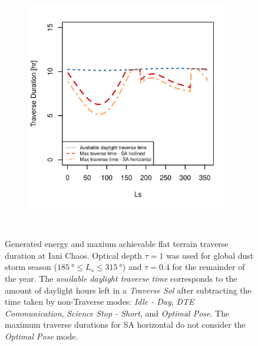 \begin{figure}[h]
\begin{subfigure}[t]{\subfigureWidth}
        \includegraphics[height=\graphicsHeight]{sections/design/solar-array/plots/ianichaos-75w-max-traverse-durations.png}
		\label{fig:plot:sub:iani-chaos-max-traverse-durations}
	\end{subfigure}\\[0.8ex]
    \caption[Generated energy and maxium achievable flat terrain traverse durations at Iani Chaos]
            {Generated energy and maxium achievable flat terrain traverse duration at Iani Chaos. Optical depth  $\tau = 1$ was used for global dust storm season ($\SI{185}{\degree} \leq L_{s} \leq \SI{315}{\degree}$) and $\tau = 0.4$ for the remainder of the year. The \textit{available daylight traverse time} corresponds to the amount of daylight hours left in a \textit{Traverse Sol} after subtracting the time taken by non-Traverse modes: \textit{Idle - Day}, \textit{\ac{DTE} Communication}, \textit{Science Stop - Short}, and \textit{Optimal Pose}. The maximum traverse durations for \ac{SA} horizontal do not consider the \textit{Optimal Pose} mode.}
    \label{fig:plot:iani-chaos-generated-energy-and-max-traverse-durations}
\vspace{-2ex}
\end{figure}

